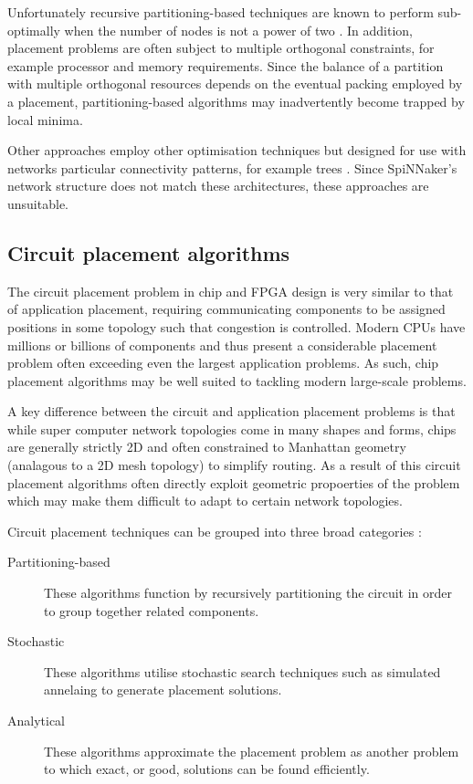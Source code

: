 				Unfortunately recursive partitioning-based techniques are known to
				perform sub-optimally when the number of nodes is not a power of two
				\cite{simon97}. In addition, placement problems are often subject to
				multiple orthogonal constraints, for example processor and memory
				requirements. Since the balance of a partition with multiple orthogonal
				resources depends on the eventual packing employed by a placement,
				partitioning-based algorithms may inadvertently become trapped by local
				minima.
				
				Other approaches employ other optimisation techniques but designed for
				use with networks particular connectivity patterns, for example trees
				\cite{jeannot14,traff02}. Since SpiNNaker's network structure does not
				match these architectures, these approaches are unsuitable.
	
		\subsection{Circuit placement algorithms}
			
			The circuit placement problem in chip and FPGA design is very similar to
			that of application placement, requiring communicating components to be
			assigned positions in some topology such that congestion is controlled.
			Modern CPUs have millions or billions of components and thus present a
			considerable placement problem often exceeding even the largest
			application problems. As such, chip placement algorithms may be well
			suited to tackling modern large-scale problems.
			
			A key difference between the circuit and application placement problems
			is that while super computer network topologies come in many shapes and
			forms, chips are generally strictly 2D and often constrained to Manhattan
			geometry (analagous to a 2D mesh topology) to simplify routing. As a
			result of this circuit placement algorithms often directly exploit
			geometric propoerties of the problem which may make them difficult to
			adapt to certain network topologies.
			
			Circuit placement techniques can be grouped into three broad categories
			\cite{kahng11}:
			
			\begin{description}
				
				\item[Partitioning-based] These algorithms function by recursively
				partitioning the circuit in order to group together related components.
				
				\item[Stochastic] These algorithms utilise stochastic search techniques
				such as simulated annelaing to generate placement solutions.
				
				\item[Analytical] These algorithms approximate the placement problem as
				another problem to which exact, or good, solutions can be found
				efficiently.
				
			\end{description}
			
